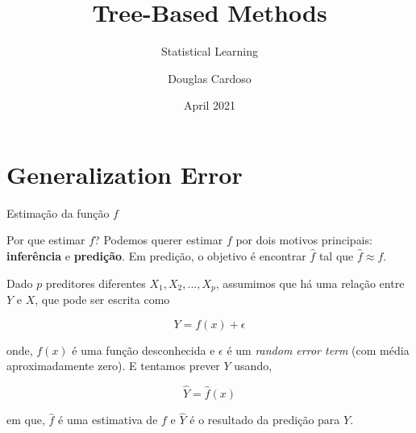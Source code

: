 \documentclass{beamer}
\title{\textbf{Tree-Based Methods}}
\subtitle{Statistical Learning}
\author[FEA.dev]{Douglas Cardoso}
\institute[]{FEA.dev - Inteligência Artificial}
\date{April 2021}
\begin{document}
    \begin{frame}
    \titlepage
    \end{frame}
    
 
\section{Generalization Error}
\begin{frame}{Estimação da função $f$}

\begin{block}{Por que estimar $f$?}
    Podemos querer estimar $f$ por dois motivos principais: \textbf{inferência} e \textbf{predição}. Em predição, o objetivo é encontrar $\hat{f}$ tal que $\hat{f} \approx f$.
\end{block}

Dado $p$ preditores diferentes $X_1, X_2, ..., X_p$, assumimos que há  uma relação entre $Y$ e $X$, que pode ser escrita como
    
    \begin{equation}
        Y = f(x) + \epsilon
    \end{equation} 
    
onde, $f(x)$ é uma função desconhecida e $\epsilon$ é um \textit{random error term} (com média aproximadamente zero). E tentamos prever $Y$ usando,

\begin{equation}
        \hat{Y} = \hat{f}(x)
    \end{equation}
    
em que, $\hat{f}$ é uma estimativa de $f$ e $\hat{Y}$ é o resultado da predição para $Y$.
\end{frame}
\end{document}
